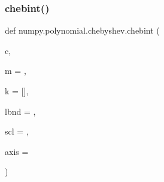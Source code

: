 \subsubsection{\texorpdfstring{chebint()}{chebint()}}
{\footnotesize\ttfamily def numpy.\+polynomial.\+chebyshev.\+chebint (\begin{DoxyParamCaption}\item[{}]{c,  }\item[{}]{m = {},  }\item[{}]{k = {\ttfamily \mbox{[}\mbox{]}},  }\item[{}]{lbnd = {},  }\item[{}]{scl = {},  }\item[{}]{axis = {} }\end{DoxyParamCaption})}

